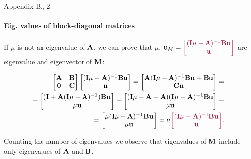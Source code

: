 \documentclass{beamer}
\begin{document}
\begin{frame}{Appendix B., 2}
	\framesubtitle{Eig. values of block-diagonal matrices}
	\begin{flushleft}
		
		If $\mu$ is not an eigenvalue of $\mathbf{A}$, we can prove that $\mu$, $\bo{u}_M = \textcolor{mydarkpink}{\begin{bmatrix}
				(\bo{I}\mu - \bo{A})^{-1} \bo{B} \bo{u}  \\  \bo{u} 
		\end{bmatrix}}$ are eigenvalue and eigenvector of $\mathbf{M}$:
	
		\begin{align*}
	\begin{bmatrix}
		\bo{A} & \bo{B} \\ \bo{0} & \bo{C}
	\end{bmatrix}
\begin{bmatrix}
	(\bo{I}\mu - \bo{A})^{-1}\bo{B} \bo{u}  \\  \bo{u} 
\end{bmatrix}
	=
	\begin{bmatrix}
		\bo{A}(\bo{I}\mu - \bo{A})^{-1}\bo{B} \bo{u} + \bo{B} \bo{u}
		 \\ 
		 \bo{C}\bo{u}
	\end{bmatrix}
	= \\
	=
	\begin{bmatrix}
		(\bo{I}+\bo{A}(\bo{I}\mu - \bo{A})^{-1}) \bo{B} \bo{u}
		\\ 
		\mu \bo{u}
	\end{bmatrix} 
=
	\begin{bmatrix}
	(\bo{I}\mu - \bo{A}+\bo{A})(\bo{I}\mu - \bo{A})^{-1} \bo{B} \bo{u}
	\\ 
	\mu \bo{u}
	\end{bmatrix} 
= \\
=
	\begin{bmatrix}
	\mu(\bo{I}\mu - \bo{A})^{-1} \bo{B} \bo{u}
	\\ 
	\mu \bo{u}
	\end{bmatrix} 
=
\mu 
\textcolor{mydarkpink}{
\begin{bmatrix}
(\bo{I}\mu - \bo{A})^{-1} \bo{B} \bo{u}
\\ 
\bo{u}
\end{bmatrix} 
}.
	\end{align*}	
	
	
	
	Counting the number of eigenvalues we observe that eigenvalues of $\mathbf{M}$ include only eigenvalues of $\mathbf{A}$ and $\mathbf{B}$.
		
	\end{flushleft}
\end{frame}
\end{document}

